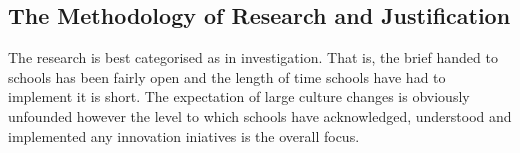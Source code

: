 \subsection{The Methodology of Research and Justification}
The research is best categorised as in investigation. That is, the brief handed to schools has been fairly open and the length of time schools have had to implement it is short. The expectation of large culture changes is obviously unfounded however the level to which schools have acknowledged, understood and implemented any innovation iniatives is the overall focus.

